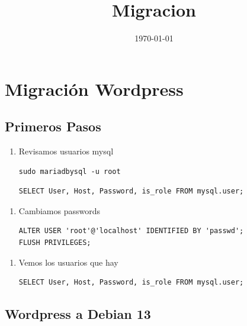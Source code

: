 \documentclass[11pt]{article}
\date{\today}
\title{Migracion}
\begin{document}
\maketitle
\tableofcontents

\section{Migración Wordpress}
\label{sec:org134793f}

\subsection{Primeros Pasos}
\label{sec:org5bbb830}

\begin{enumerate}
\item Revisamos usuarios mysql

\begin{verbatim}
sudo mariadbysql -u root
\end{verbatim}

\begin{verbatim}
SELECT User, Host, Password, is_role FROM mysql.user;
\end{verbatim}
\end{enumerate}


\begin{enumerate}
\item Cambiamos passwords

\begin{verbatim}
ALTER USER 'root'@'localhost' IDENTIFIED BY 'passwd';
FLUSH PRIVILEGES;
\end{verbatim}
\end{enumerate}


\begin{enumerate}
\item Vemos los usuarios que hay

\begin{verbatim}
SELECT User, Host, Password, is_role FROM mysql.user;
\end{verbatim}
\end{enumerate}
\subsection{Wordpress a Debian 13}
\label{sec:org989110c}
\end{document}
